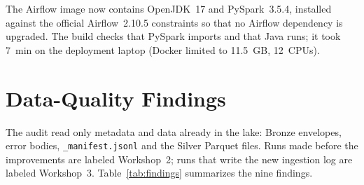 \documentclass[10pt,twocolumn,letterpaper]{article}
\newcommand{\code}[1]{\texttt{\footnotesize #1}}
\begin{document}
The Airflow image now contains OpenJDK~17 and PySpark~3.5.4, installed against the official Airflow~2.10.5 constraints so that no Airflow dependency is upgraded. The build checks that PySpark imports and that Java runs; it took 7~min on the deployment laptop (Docker limited to 11.5~GB, 12~CPUs).

\section{Data-Quality Findings}\label{sec:findings}

The audit read only metadata and data already in the lake: Bronze envelopes, error bodies, \code{\_manifest.jsonl} and the Silver Parquet files. Runs made before the improvements are labeled Workshop~2; runs that write the new ingestion log are labeled Workshop~3. Table~\ref{tab:findings} summarizes the nine findings.
\end{document}
